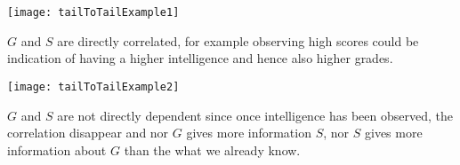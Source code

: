 \begin{minipage}[htp]{\linewidth}
	\begin{minipage}[t]{0.48\linewidth}
		\begin{center}
			\texttt{[image: tailToTailExample1]}
		\end{center}
		$G$ and $S$ are directly correlated, for example observing high scores could be indication of having a higher intelligence and hence also higher grades. 
	\end{minipage}
	\hspace{0.04\linewidth}
	\begin{minipage}[t]{0.48\linewidth}
		\begin{center}
			\texttt{[image: tailToTailExample2]}
		\end{center}
		$G$ and $S$ are not directly dependent since once intelligence has been observed, the correlation disappear and nor $G$ gives more information $S$, nor $S$ gives more information about $G$ than the what we already know. 
	\end{minipage}
\end{minipage}
%
